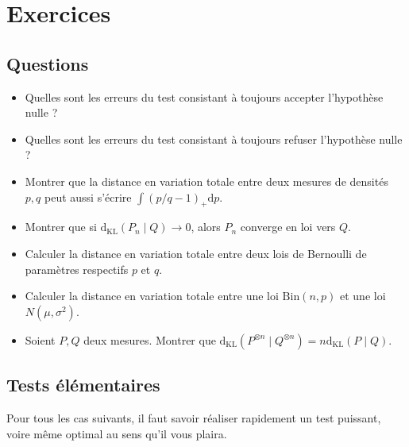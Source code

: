 \documentclass[
  10,
  letterpaper,
  DIV=11,
  numbers=noendperiod]{scrreport}
\providecommand{\tightlist}{%
  \setlength{\itemsep}{0pt}\setlength{\parskip}{0pt}}\usepackage{longtable,booktabs,array}
\newcommand{\dkl}{\mathrm{d}_{\mathrm{KL}}}
\theoremstyle{plain}
\theoremstyle{definition}
\theoremstyle{plain}
\theoremstyle{definition}
\theoremstyle{definition}
\theoremstyle{plain}
\theoremstyle{remark}
\begin{document}

\hypertarget{exercices-4}{%
\chapter*{Exercices}\label{exercices-4}}


\hypertarget{questions-2}{%
\section*{Questions}\label{questions-2}}


\begin{itemize}
\tightlist
\item
  Quelles sont les erreurs du test consistant à toujours accepter
  l'hypothèse nulle ?
\item
  Quelles sont les erreurs du test consistant à toujours refuser
  l'hypothèse nulle ?
\item
  Montrer que la distance en variation totale entre deux mesures de
  densités \(p,q\) peut aussi s'écrire \(\int(p/q-1)_+ \mathrm{d}p\).
\item
  Montrer que si \(\mathrm{d}_{\mathrm{KL}}(P_n \mid Q) \to 0\), alors
  \(P_n\) converge en loi vers \(Q\).
\item
  Calculer la distance en variation totale entre deux lois de Bernoulli
  de paramètres respectifs \(p\) et \(q\).
\item
  Calculer la distance en variation totale entre une loi
  \(\mathrm{Bin}(n,p)\) et une loi \(N(\mu,\sigma^2)\).
\item
  Soient \(P,Q\) deux mesures. Montrer que
  \(\dkl(P^{\otimes n} \mid Q^{\otimes n}) = n \dkl(P \mid Q)\).
\end{itemize}

\hypertarget{tests-uxe9luxe9mentaires}{%
\section*{Tests élémentaires}\label{tests-uxe9luxe9mentaires}}


Pour tous les cas suivants, il faut savoir réaliser rapidement un test
puissant, voire même optimal au sens qu'il vous plaira.
\end{document}
